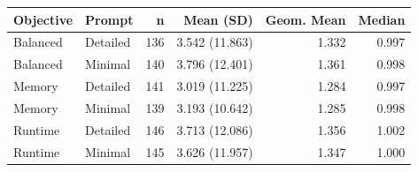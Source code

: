 \begin{tabular}{llrrrr}
\toprule
Objective & Prompt & n & Mean (SD) & Geom. Mean & Median \\
\midrule
Balanced & Detailed & 136 & 3.542 (11.863) & 1.332 & 0.997 \\
Balanced & Minimal & 140 & 3.796 (12.401) & 1.361 & 0.998 \\
Memory & Detailed & 141 & 3.019 (11.225) & 1.284 & 0.997 \\
Memory & Minimal & 139 & 3.193 (10.642) & 1.285 & 0.998 \\
Runtime & Detailed & 146 & 3.713 (12.086) & 1.356 & 1.002 \\
Runtime & Minimal & 145 & 3.626 (11.957) & 1.347 & 1.000 \\
\bottomrule
\end{tabular}

